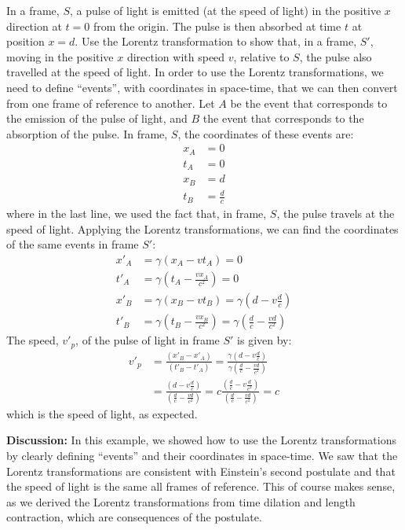 \begin{example}{In a frame, $S$, a pulse of light is emitted (at the speed of light) in the positive $x$ direction at $t=0$ from the origin. The pulse is then absorbed at time $t$ at position $x=d$. Use the Lorentz transformation to show that, in a frame, $S'$, moving in the positive $x$ direction with speed $v$, relative to $S$, the pulse also travelled at the speed of light.}
In order to use the Lorentz transformations, we need to define ``events'', with coordinates in space-time, that we can then convert from one frame of reference to another. Let $A$ be the event that corresponds to the emission of the pulse of light, and $B$ the event that corresponds to the absorption of the pulse. In frame, $S$, the coordinates of these events are:
\begin{align*}
x_A&=0\\
t_A&=0\\
x_B&=d\\
t_B&=\frac{d}{c}
\end{align*}
where in the last line, we used the fact that, in frame, $S$, the pulse travels at the speed of light. Applying the Lorentz transformations, we can find the coordinates of the same events in frame $S'$:
\begin{align*}
x'_A&=\gamma (x_A-vt_A)=0\\
t'_A&=\gamma\left(t_A-\frac{vx_A}{c^2} \right)=0\\
x'_B&=\gamma (x_B-vt_B)=\gamma \left(d-v\frac{d}{c}\right)\\
t'_B&=\gamma\left(t_B-\frac{vx_B}{c^2} \right)=\gamma\left(\frac{d}{c}-\frac{vd}{c^2} \right)
\end{align*} 
The speed, $v'_p$, of the pulse of light in frame $S'$ is given by:
\begin{align*}
v'_p&=\frac{(x'_B-x'_A)}{(t'_B-t'_A)}=\frac{\gamma \left(d-v\frac{d}{c}\right)}{\gamma\left(\frac{d}{c}-\frac{vd}{c^2} \right)}\\
&=\frac{\left(d-v\frac{d}{c}\right)}{\left(\frac{d}{c}-\frac{vd}{c^2} \right)}=c\frac{\left(\frac{d}{c}-v\frac{d}{c^2}\right)}{\left(\frac{d}{c}-\frac{vd}{c^2} \right)}=c
\end{align*}
which is the speed of light, as expected. 

\textbf{Discussion: }In this example, we showed how to use the Lorentz transformations by clearly defining ``events'' and their coordinates in space-time. We saw that the Lorentz transformations are consistent with Einstein's second postulate and that the speed of light is the same all frames of reference. This of course makes sense, as we derived the Lorentz transformations from time dilation and length contraction, which are consequences of the postulate.
\end{example}



